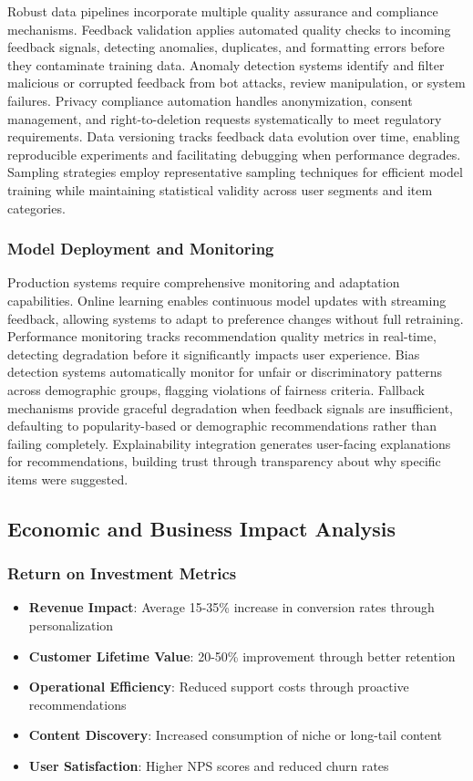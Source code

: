 Robust data pipelines incorporate multiple quality assurance and compliance mechanisms. Feedback validation applies automated quality checks to incoming feedback signals, detecting anomalies, duplicates, and formatting errors before they contaminate training data. Anomaly detection systems identify and filter malicious or corrupted feedback from bot attacks, review manipulation, or system failures. Privacy compliance automation handles anonymization, consent management, and right-to-deletion requests systematically to meet regulatory requirements. Data versioning tracks feedback data evolution over time, enabling reproducible experiments and facilitating debugging when performance degrades. Sampling strategies employ representative sampling techniques for efficient model training while maintaining statistical validity across user segments and item categories.

\subsubsection{Model Deployment and Monitoring}

Production systems require comprehensive monitoring and adaptation capabilities. Online learning enables continuous model updates with streaming feedback, allowing systems to adapt to preference changes without full retraining. Performance monitoring tracks recommendation quality metrics in real-time, detecting degradation before it significantly impacts user experience. Bias detection systems automatically monitor for unfair or discriminatory patterns across demographic groups, flagging violations of fairness criteria. Fallback mechanisms provide graceful degradation when feedback signals are insufficient, defaulting to popularity-based or demographic recommendations rather than failing completely. Explainability integration generates user-facing explanations for recommendations, building trust through transparency about why specific items were suggested.

\subsection{Economic and Business Impact Analysis}

\subsubsection{Return on Investment Metrics}

\begin{itemize}
    \item \textbf{Revenue Impact}: Average 15-35\% increase in conversion rates through personalization
    \item \textbf{Customer Lifetime Value}: 20-50\% improvement through better retention
    \item \textbf{Operational Efficiency}: Reduced support costs through proactive recommendations
    \item \textbf{Content Discovery}: Increased consumption of niche or long-tail content
    \item \textbf{User Satisfaction}: Higher NPS scores and reduced churn rates
\end{itemize}

